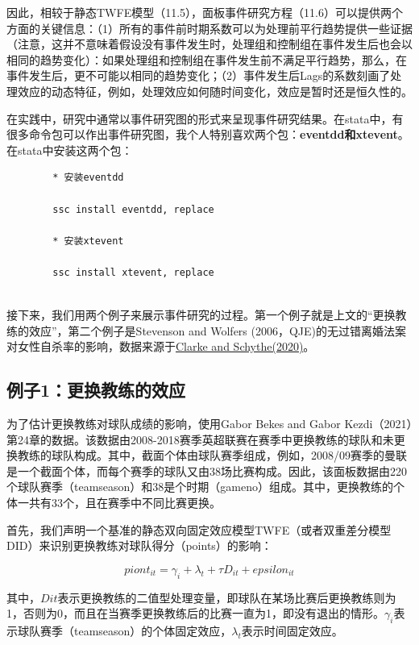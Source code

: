 \documentclass[cn,12pt,math=newtx,citestyle=gb7714-2015,bibstyle=gb7714-2015]{elegantbook}
\begin{document}
	  因此，相较于静态TWFE模型（11.5），面板事件研究方程（11.6）可以提供两个方面的关键信息：（1）所有的事件前时期系数可以为处理前平行趋势提供一些证据（注意，这并不意味着假设没有事件发生时，处理组和控制组在事件发生后也会以相同的趋势变化）：如果处理组和控制组在事件发生前不满足平行趋势，那么，在事件发生后，更不可能以相同的趋势变化；（2）事件发生后Lags的系数刻画了处理效应的动态特征，例如，处理效应如何随时间变化，效应是暂时还是恒久性的。
	  
	  在实践中，研究中通常以事件研究图的形式来呈现事件研究结果。在stata中，有很多命令包可以作出事件研究图，我个人特别喜欢两个包：\textbf{eventdd和xtevent}。在stata中安装这两个包：
	  
	  \begin{lstlisting}
	  	* 安装eventdd
	  	
	  	ssc install eventdd, replace
	  	
	  	* 安装xtevent
	  	
	  	ssc install xtevent, replace
	  	
	  \end{lstlisting}
	  
	  接下来，我们用两个例子来展示事件研究的过程。第一个例子就是上文的“更换教练的效应”，第二个例子是Stevenson and Wolfers (2006，QJE)的无过错离婚法案对女性自杀率的影响，数据来源于\href{http://www.damianclarke.net/stata/bacon_example.dta}{Clarke and Schythe(2020)}。
	  
	  
	  \subsection*{例子1：更换教练的效应}
	  
	  为了估计更换教练对球队成绩的影响，使用Gabor Bekes and  Gabor Kezdi（2021）第24章的数据。该数据由2008-2018赛季英超联赛在赛季中更换教练的球队和未更换教练的球队构成。其中，截面个体由球队赛季组成，例如，2008/09赛季的曼联是一个截面个体，而每个赛季的球队又由38场比赛构成。因此，该面板数据由220个球队赛季（teamseason）和38是个时期（gameno）组成。其中，更换教练的个体一共有33个，且在赛季中不同比赛更换。
	  
	  首先，我们声明一个基准的静态双向固定效应模型TWFE（或者双重差分模型DID）来识别更换教练对球队得分（points）的影响：
	  
	  \begin{equation}
	  	piont_{it}=\gamma_i + \lambda_t +\tau D_{it}+epsilon_{it}
	  \end{equation}
	  
	  其中，$D{it}$表示更换教练的二值型处理变量，即球队在某场比赛后更换教练则为1，否则为0，而且在当赛季更换教练后的比赛一直为1，即没有退出的情形。$\gamma_i $表示球队赛季（teamseason）的个体固定效应，$ \lambda_t $表示时间固定效应。
	  
\end{document}
